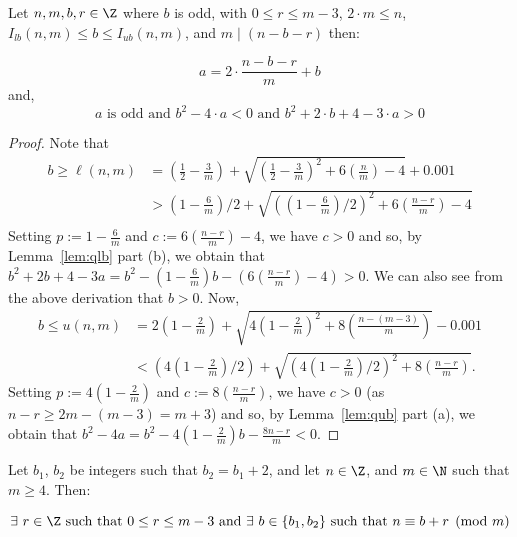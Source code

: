 \begin{lemma}[main]
    \label{lem:main}
    \leanok
    Let $n,m,b,r\in\Z$ where $b$ is odd, with $0 \leq r \leq m - 3$, $2\cdot m \leq n$, $I_{lb}(n,m)\leq b \leq I_{ub}(n,m)$, and $m \mid (n-b-r)$ then:
    
    \[
        a = 2\cdot \frac{n - b - r}{m} + b
        \]
        and,
        \[
            a\text{ is odd and } b^2 - 4\cdot a < 0 \text{ and } b^2 + 2 \cdot b + 4 - 3\cdot a > 0
            \]    
        \end{lemma}
        
\begin{proof}
    \leanok
Note that
\begin{align*}
b \geq \ell(n,m)
& =
  \left(\frac{1}{2}-\frac{3}{m}\right)
  + \sqrt{\left(\frac{1}{2}-\frac{3}{m}\right)^2
  + 6\left(\frac{n}{m}\right) - 4}+0.001 \\ 
& >
  \left(1-\frac{6}{m}\right)/2
  +\sqrt{\left(\left(1-\frac{6}{m}\right)/2\right)^2
  + 6\left(\frac{n-r}{m}\right) - 4} \\
\end{align*}
Setting $p := 1 - \frac{6}{m}$ and $c := 6 \left(\frac{n - r}{m}\right) - 4$,
  we have $c > 0$ and so, by Lemma~\ref{lem:qlb} part (b), we obtain that
$b^2 + 2b + 4 - 3a = b ^ 2 - \left(1 - \frac{6}{m}\right) b -
\left(6\left(\frac{n - r}{m}\right) - 4\right) > 0$.
We can also see from the above derivation that $b > 0$. 
Now, 
\begin{align*}
  b \leq u(n,m) 
  & = 2\left(1-\frac{2}{m}\right)+\sqrt{4\left(1-\frac{2}{m}\right)^2
      + 8\left(\frac{n-(m-3)}{m}\right)} - 0.001 \\
  & < \left(4\left(1-\frac{2}{m}\right)/2\right) 
      + \sqrt{\left(4\left(1-\frac{2}{m}\right)/2\right)^2
      + 8\left(\frac{n-r}{m}\right)}.
\end{align*}
Setting $p := 4 \left(1 - \frac{2}{m}\right)$ and 
$c := 8 \left(\frac{n - r}{m}\right)$,
we have $c > 0$ (as $n - r \geq 2m - (m-3) = m+3$) and so, by 
  Lemma~\ref{lem:qub} part (a),
we obtain that
$b^2 - 4a = b^2 - 4 \left(1 - \frac{2}{m}\right) b - \frac{8n - r}{m} < 0.$

\end{proof}


\begin{theorem}
    \label{thm:mod_m_congr}
    \leanok
    Let $b_1$, $b_2$ be integers such that $b_2 = b_1 + 2$, and let $n\in \Z$, and $m\in \N$ such that $m \geq 4$. Then:
    
    \[
        \exists\ r \in \Z \text{ such that } 0 \leq r \leq m - 3\text{ and } \exists\ b\in \{b_1, b_2\} \text{ such that } n \equiv b + r \pmod{m}
    \]
\end{theorem}
    

